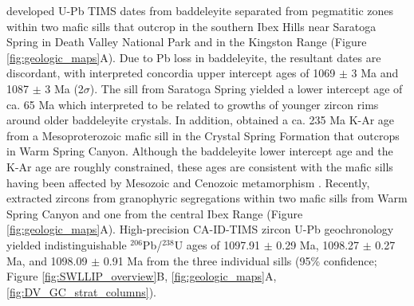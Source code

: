 \cite{Heaman1992b} developed U-Pb TIMS dates from baddeleyite separated from pegmatitic zones within two mafic sills that outcrop in the southern Ibex Hills near Saratoga Spring in Death Valley National Park and in the Kingston Range (Figure \ref{fig:geologic_maps}A). Due to Pb loss in baddeleyite, the resultant dates are discordant, with interpreted concordia upper intercept ages of 1069 $\pm$ 3 Ma and 1087 $\pm$ 3 Ma (2$\sigma$). The sill from Saratoga Spring yielded a lower intercept age of ca. 65 Ma which \cite{Heaman1992b} interpreted to be related to growths of younger zircon rims around older baddeleyite crystals. In addition, \cite{Wasserburg1964a} obtained a ca. 235 Ma K-Ar age from a Mesoproterozoic mafic sill in the Crystal Spring Formation that outcrops in Warm Spring Canyon. Although the baddeleyite lower intercept age and the K-Ar age are roughly constrained, these ages are consistent with the mafic sills having been affected by Mesozoic and Cenozoic metamorphism \citep{Snow1989a, Snow2000a}. Recently, \cite{Mohr2024a} extracted zircons from granophyric segregations within two mafic sills from Warm Spring Canyon and one from the central Ibex Range (Figure \ref{fig:geologic_maps}A). High-precision CA-ID-TIMS zircon U-Pb geochronology yielded indistinguishable $^{206}$Pb/$^{238}$U ages of 1097.91  $\pm$  0.29 Ma, 1098.27  $\pm$  0.27 Ma, and 1098.09  $\pm$  0.91 Ma from the three individual sills (95\% confidence; Figure \ref{fig:SWLLIP_overview}B, \ref{fig:geologic_maps}A, \ref{fig:DV_GC_strat_columns}). 


